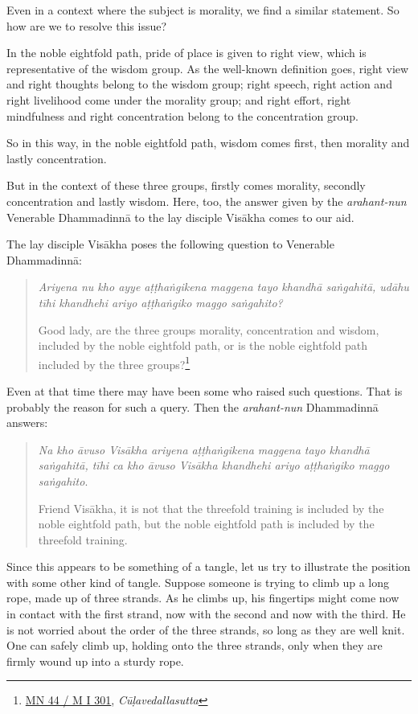 Even in a context where the subject is morality, we find a similar statement. So how are we to resolve this issue?

In the noble eightfold path, pride of place is given to right view, which is representative of the wisdom group. As the well-known definition goes, right view and right thoughts belong to the wisdom group; right speech, right action and right livelihood come under the morality group; and right effort, right mindfulness and right concentration belong to the concentration group.

So in this way, in the noble eightfold path, wisdom comes first, then morality and lastly concentration.

But in the context of these three groups, firstly comes morality, secondly concentration and lastly wisdom. Here, too, the answer given by the \emph{arahant-nun} Venerable Dhammadinnā to the lay disciple Visākha comes to our aid.

The lay disciple Visākha poses the following question to Venerable Dhammadinnā:

\begin{quote}
\emph{Ariyena nu kho ayye aṭṭhaṅgikena maggena tayo khandhā saṅgahitā, udāhu tīhi khandhehi ariyo aṭṭhaṅgiko maggo saṅgahito?}

Good lady, are the three groups morality, concentration and wisdom, included by the noble eightfold path, or is the noble eightfold path included by the three groups?\footnote{\href{https://suttacentral.net/mn44/pli/ms}{MN 44 / M I 301}, \emph{Cūḷavedallasutta}}
\end{quote}

Even at that time there may have been some who raised such questions. That is probably the reason for such a query. Then the \emph{arahant-nun} Dhammadinnā answers:

\begin{quote}
\emph{Na kho āvuso Visākha ariyena aṭṭhaṅgikena maggena tayo khandhā saṅgahitā, tīhi ca kho āvuso Visākha khandhehi ariyo aṭṭhaṅgiko maggo saṅgahito}.

Friend Visākha, it is not that the threefold training is included by the noble eightfold path, but the noble eightfold path is included by the threefold training.
\end{quote}

Since this appears to be something of a tangle, let us try to illustrate the position with some other kind of tangle. Suppose someone is trying to climb up a long rope, made up of three strands. As he climbs up, his fingertips might come now in contact with the first strand, now with the second and now with the third. He is not worried about the order of the three strands, so long as they are well knit. One can safely climb up, holding onto the three strands, only when they are firmly wound up into a sturdy rope.

